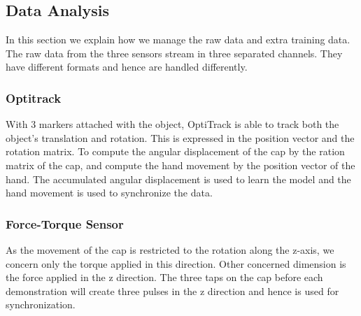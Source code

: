 \subsection{Data Analysis}
\label{dataanalysis}
In this section we explain how we manage the raw data and extra training data.
The raw data from the three sensors stream in three separated channels. They have different formats and hence are handled differently.


\subsubsection{Optitrack}
\label{sec:optiktrack}
With 3 markers attached with the object, OptiTrack is able to track both the object's translation and rotation. This is expressed in the position vector and the rotation matrix. To compute the angular displacement of the cap by the ration matrix of the cap, and compute the hand movement by the position vector of the hand. The accumulated angular displacement is used to learn the model and the hand movement is used to synchronize the data. %
%

\subsubsection{Force-Torque Sensor}
\label{ftsensor}
As the movement of the cap is restricted to the rotation along the z-axis, we concern only the torque applied in this direction.  %
Other concerned dimension is the force applied in the z direction. The three taps on the cap before each demonstration will create three pulses in the z direction and hence is used for synchronization.



